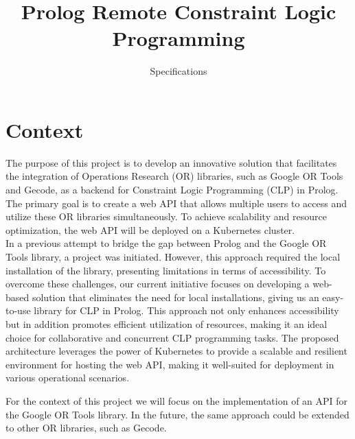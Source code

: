 \documentclass[en]{customTemplate}
\title{Prolog Remote Constraint Logic Programming}
\subtitle{Specifications}
\begin{document}
\maketitlepage{}
\makerevisiontable{}

%

\maketableofcontent{}

\fullheader


\section{Context}

The purpose of this project is to develop an innovative solution that facilitates the integration of Operations Research (OR) libraries, such as Google OR Tools and Gecode, as a backend for Constraint Logic Programming (CLP) in Prolog. The primary goal is to create a web API that allows multiple users to access and utilize these OR libraries simultaneously. To achieve scalability and resource optimization, the web API will be deployed on a Kubernetes cluster.\\

In a previous attempt to bridge the gap between Prolog and the Google OR Tools library, a project was initiated. However, this approach required the local installation of the library, presenting limitations in terms of accessibility. To overcome these challenges, our current initiative focuses on developing a web-based solution that eliminates the need for local installations, giving us an easy-to-use library for CLP in Prolog. This approach not only enhances accessibility but in addition promotes efficient utilization of resources, making it an ideal choice for collaborative and concurrent CLP programming tasks. The proposed architecture leverages the power of Kubernetes to provide a scalable and resilient environment for hosting the web API, making it well-suited for deployment in various operational scenarios.

For the context of this project we will focus on the implementation of an API for the Google OR Tools library. In the future, the same approach could be extended to other OR libraries, such as Gecode.

\end{document}
